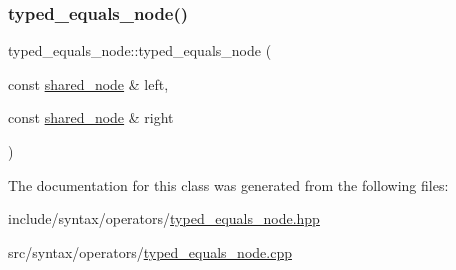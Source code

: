 \subsubsection{\texorpdfstring{typed\+\_\+equals\+\_\+node()}{typed\_equals\_node()}}
{\footnotesize\ttfamily typed\+\_\+equals\+\_\+node\+::typed\+\_\+equals\+\_\+node (\begin{DoxyParamCaption}\item[{const \hyperlink{namespacejawe_a3f307481d921b6cbb50cc8511fc2b544}{shared\+\_\+node} \&}]{left,  }\item[{const \hyperlink{namespacejawe_a3f307481d921b6cbb50cc8511fc2b544}{shared\+\_\+node} \&}]{right }\end{DoxyParamCaption})}



The documentation for this class was generated from the following files\+:\begin{DoxyCompactItemize}
\item 
include/syntax/operators/\hyperlink{typed__equals__node_8hpp}{typed\+\_\+equals\+\_\+node.\+hpp}\item 
src/syntax/operators/\hyperlink{typed__equals__node_8cpp}{typed\+\_\+equals\+\_\+node.\+cpp}\end{DoxyCompactItemize}

